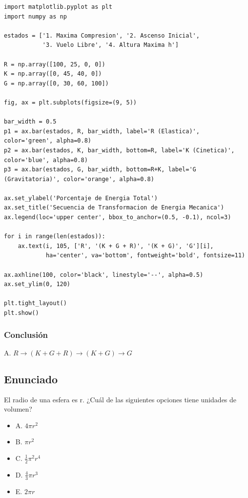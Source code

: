\documentclass[12pt, a4paper]{article}
\begin{document}
\begin{lstlisting}
import matplotlib.pyplot as plt
import numpy as np

estados = ['1. Maxima Compresion', '2. Ascenso Inicial',
           '3. Vuelo Libre', '4. Altura Maxima h']

R = np.array([100, 25, 0, 0])
K = np.array([0, 45, 40, 0])
G = np.array([0, 30, 60, 100])

fig, ax = plt.subplots(figsize=(9, 5))

bar_width = 0.5
p1 = ax.bar(estados, R, bar_width, label='R (Elastica)', color='green', alpha=0.8)
p2 = ax.bar(estados, K, bar_width, bottom=R, label='K (Cinetica)', color='blue', alpha=0.8)
p3 = ax.bar(estados, G, bar_width, bottom=R+K, label='G (Gravitatoria)', color='orange', alpha=0.8)

ax.set_ylabel('Porcentaje de Energia Total')
ax.set_title('Secuencia de Transformacion de Energia Mecanica')
ax.legend(loc='upper center', bbox_to_anchor=(0.5, -0.1), ncol=3)

for i in range(len(estados)):
    ax.text(i, 105, ['R', '(K + G + R)', '(K + G)', 'G'][i], 
            ha='center', va='bottom', fontweight='bold', fontsize=11)

ax.axhline(100, color='black', linestyle='--', alpha=0.5)
ax.set_ylim(0, 120)

plt.tight_layout()
plt.show()
\end{lstlisting}

\subsubsection*{Conclusión}

A. $R \to (K + G + R) \to (K + G) \to G$

\newpage

\subsection*{Enunciado}

El radio de una esfera es r. ¿Cuál de las siguientes opciones tiene unidades de volumen?

\begin{itemize}
    \item A. $4\pi r^2$
    \item B. $\pi r^2$
    \item C. $\frac{1}{2}\pi^2 r^4$
    \item D. $\frac{4}{3}\pi r^3$
    \item E. $2\pi r$
\end{itemize}
\end{document}
